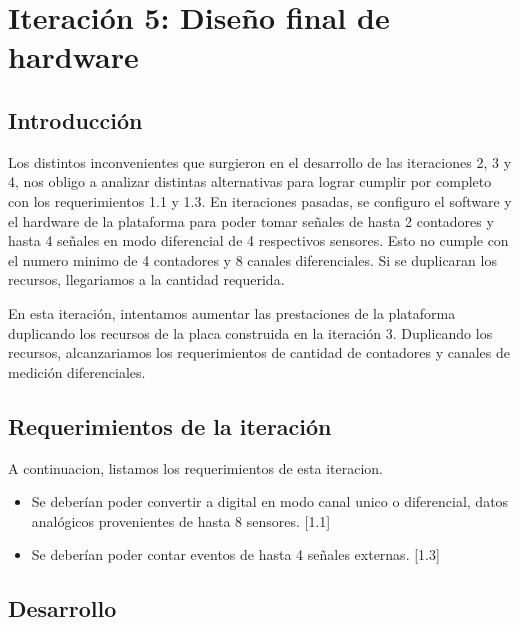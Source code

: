 \chapter{Iteración 5: Diseño final de hardware} %
\label{cha:iteracion_5}

\section{Introducción} %
\label{sec:introduccion}

Los distintos inconvenientes que surgieron en el desarrollo de las iteraciones 2, 3 y 4, nos obligo a analizar distintas alternativas para lograr cumplir por completo con los requerimientos 1.1 y 1.3. En iteraciones pasadas, se configuro el software y el hardware de la plataforma para poder tomar señales de hasta 2 contadores y hasta 4 señales en modo diferencial de 4 respectivos sensores. Esto no cumple con el numero minimo de 4 contadores y 8 canales diferenciales. Si se duplicaran los recursos, llegariamos a la cantidad requerida.

En esta iteración, intentamos aumentar las prestaciones de la plataforma duplicando los recursos de la placa construida en la iteración 3. Duplicando los recursos, alcanzariamos los requerimientos de cantidad de contadores y canales de medición diferenciales.


\section{Requerimientos de la iteración} %
\label{sec:requerimientos_de_la_iteracion}

A continuacion, listamos los requerimientos de esta iteracion.

\begin{itemize}
  \item Se deberían poder convertir a digital en modo canal unico o diferencial, datos analógicos provenientes de hasta 8 sensores. [1.1]
  \item Se deberían poder contar eventos de hasta 4 señales externas. [1.3]
\end{itemize}


\section{Desarrollo} %
\label{sec:desarrollo}

